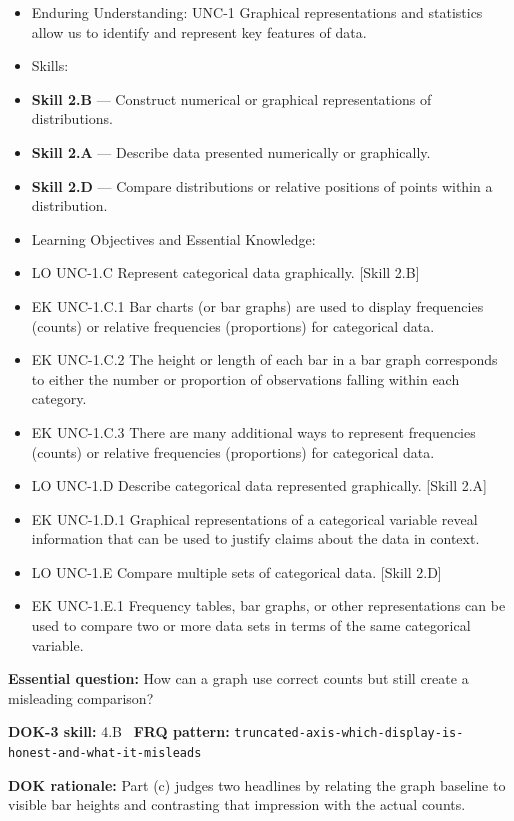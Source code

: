 \documentclass[11pt]{article}
\begin{document}


{\small
\begin{itemize}[leftmargin=1.5em,itemsep=2pt,topsep=2pt]
  \item Enduring Understanding: UNC-1 Graphical representations and statistics allow us to identify and represent key features of data.
  \item Skills:
  \item \textbf{Skill 2.B} --- Construct numerical or graphical representations of distributions.
  \item \textbf{Skill 2.A} --- Describe data presented numerically or graphically.
  \item \textbf{Skill 2.D} --- Compare distributions or relative positions of points within a distribution.
  \item Learning Objectives and Essential Knowledge:
  \item LO UNC-1.C Represent categorical data graphically. [Skill 2.B]
  \item EK UNC-1.C.1 Bar charts (or bar graphs) are used to display frequencies (counts) or relative frequencies (proportions) for categorical data.
  \item EK UNC-1.C.2 The height or length of each bar in a bar graph corresponds to either the number or proportion of observations falling within each category.
  \item EK UNC-1.C.3 There are many additional ways to represent frequencies (counts) or relative frequencies (proportions) for categorical data.
  \item LO UNC-1.D Describe categorical data represented graphically. [Skill 2.A]
  \item EK UNC-1.D.1 Graphical representations of a categorical variable reveal information that can be used to justify claims about the data in context.
  \item LO UNC-1.E Compare multiple sets of categorical data. [Skill 2.D]
  \item EK UNC-1.E.1 Frequency tables, bar graphs, or other representations can be used to compare two or more data sets in terms of the same categorical variable.
\end{itemize}
}
\textbf{Essential question:} How can a graph use correct counts but still create a misleading comparison?\par
\textbf{DOK-3 skill:} 4.B \textperiodcentered\ \textbf{FRQ pattern:} {\small\texttt{truncated-\allowbreak{}axis-\allowbreak{}which-\allowbreak{}display-\allowbreak{}is-\allowbreak{}honest-\allowbreak{}and-\allowbreak{}what-\allowbreak{}it-\allowbreak{}misleads}}\par
\textbf{DOK rationale:} Part (c) judges two headlines by relating the graph baseline to visible bar heights and contrasting that impression with the actual counts.\par
\end{document}
